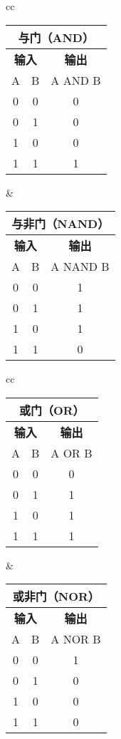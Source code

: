 \begin{tabular}{cc}%
	\begin{tabular}{|c|c|c|}
		\multicolumn{3}{c}{\textbf{与门（AND）}} \\
		\hline
		\multicolumn{2}{|c|}{\textbf{输入}} & \textbf{输出} \\
		\hline
		A & B & A AND B \\
		\hline
		0 & 0 & 0 \\
		\hline
		0 & 1 & 0 \\
		\hline
		1 & 0 & 0 \\
		\hline
		1 & 1 & 1 \\
		\hline
	\end{tabular} &
	\begin{tabular}{|c|c|c|}
		\multicolumn{3}{c}{\textbf{与非门（NAND）}} \\
		\hline
		\multicolumn{2}{|c|}{\textbf{输入}} & \textbf{输出} \\
		\hline
		A & B & A NAND B \\
		\hline
		0 & 0 & 1 \\
		\hline
		0 & 1 & 1 \\
		\hline
		1 & 0 & 1 \\
		\hline
		1 & 1 & 0 \\
		\hline
	\end{tabular} \tabularnewline
\end{tabular}

\bigskip

\begin{tabular}{cc}%
	\begin{tabular}{|c|c|c|}
		\multicolumn{3}{c}{\textbf{或门（OR）}} \\
		\hline
		\multicolumn{2}{|c|}{\textbf{输入}} & \textbf{输出} \\
		\hline
		A & B & A OR B \\
		\hline
		0 & 0 & 0 \\
		\hline
		0 & 1 & 1 \\
		\hline
		1 & 0 & 1 \\
		\hline
		1 & 1 & 1 \\
		\hline
	\end{tabular} &
	\begin{tabular}{|c|c|c|}
		\multicolumn{3}{c}{\textbf{或非门（NOR）}} \\
		\hline
		\multicolumn{2}{|c|}{\textbf{输入}} & \textbf{输出} \\
		\hline
		A & B & A NOR B \\
		\hline
		0 & 0 & 1 \\
		\hline
		0 & 1 & 0 \\
		\hline
		1 & 0 & 0 \\
		\hline
		1 & 1 & 0 \\
		\hline
	\end{tabular}  \tabularnewline
\end{tabular}

